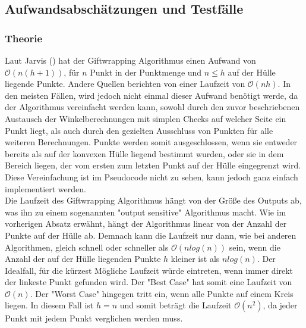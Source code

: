\documentclass[Labor, MSC, german]{twbook}
\begin{document}
\subsection{Aufwandsabschätzungen und Testfälle}
\subsubsection{Theorie}
Laut Jarvis (\cite{JARVIS197318}) hat der Giftwrapping Algorithmus einen Aufwand von $\mathcal{O}(n(h+1))$, für $n$ Punkt in der Punktmenge und $n\leq h$ auf der Hülle liegende Punkte. Andere Quellen berichten von einer Laufzeit von $\mathcal{O}(nh)$. In den meisten Fällen, wird jedoch nicht einmal dieser Aufwand benötigt werde, da der Algorithmus vereinfacht werden kann, sowohl durch den zuvor beschriebenen Austausch der Winkelberechnungen mit simplen Checks auf welcher Seite ein Punkt liegt, als auch durch den gezielten Ausschluss von Punkten für alle weiteren Berechnungen. Punkte werden somit ausgeschlossen, wenn sie entweder bereits als auf der konvexen Hülle liegend bestimmt wurden, oder sie in dem Bereich liegen, der vom ersten zum letzten Punkt auf der Hülle eingegrenzt wird. Diese Vereinfachung ist im Pseudocode nicht zu sehen, kann jedoch ganz einfach implementiert werden.\\

Die Laufzeit des Giftwrapping Algorithmus hängt von der Größe des Outputs ab, was ihn zu einem sogenannten "output sensitive" Algorithmus macht. Wie im vorherigen Absatz erwähnt, hängt der Algorithmus linear von der Anzahl der Punkte auf der Hülle ab. Demnach kann die Laufzeit nur dann, wie bei anderen Algorithmen, gleich schnell oder schneller als $\mathcal{O}(nlog(n))$ sein, wenn die Anzahl der auf der Hülle liegenden Punkte $h$ kleiner ist als $nlog(n)$. Der Idealfall, für die kürzest Mögliche Laufzeit würde eintreten, wenn immer direkt der linkeste Punkt gefunden wird. Der "Best Case" hat somit eine Laufzeit von $\mathcal{O}(n)$. Der "Worst Case" hingegen tritt ein, wenn alle Punkte auf einem Kreis liegen. In diesem Fall ist 
$h=n$ und somit beträgt die Laufzeit $\mathcal{O}(n^2)$, da jeder Punkt mit jedem Punkt verglichen werden muss.
\end{document}
